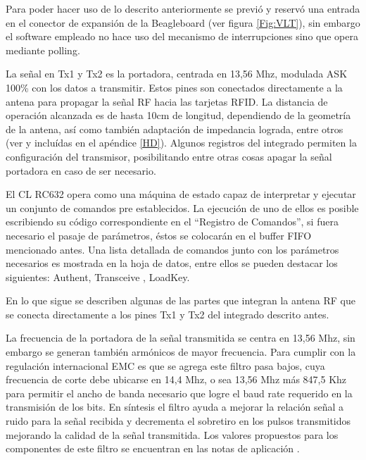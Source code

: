 Para poder hacer uso de lo descrito anteriormente se previó y reservó una entrada en el conector de expansión de la Beagleboard (ver figura \ref{Fig:VLT}), sin embargo el software empleado no hace uso del mecanismo de interrupciones sino que opera mediante polling.

\bigskip
{}

La señal en Tx1 y Tx2 es la portadora, centrada en 13,56 Mhz, modulada ASK 100\% con los datos a transmitir. Estos pines son conectados directamente a la antena para propagar la señal RF hacia las tarjetas RFID. La distancia de operación alcanzada es de hasta 10cm de longitud, dependiendo de la geometría de la antena, así como también adaptación de impedancia lograda, entre otros (ver \cite{MRICF} y \cite{RFIDPA} incluídas en el apéndice \ref{HD}).
Algunos registros del integrado permiten la configuración del transmisor, posibilitando entre otras cosas apagar la señal portadora en caso de ser necesario.

\bigskip
{}

El CL RC632 opera como una máquina de estado capaz de interpretar y ejecutar un conjunto de comandos pre establecidos. La ejecución de uno de ellos es posible escribiendo su código correspondiente en el “Registro de Comandos”, si fuera necesario el pasaje de parámetros, éstos se colocarán en el buffer FIFO mencionado antes. 
Una lista detallada de comandos junto con los parámetros necesarios es mostrada en la hoja de datos, entre ellos se pueden destacar los siguientes: Authent, Transceive , LoadKey.

\bigskip
{}

En lo que sigue se describen algunas de las partes que integran la antena RF que se conecta directamente a los pines Tx1 y Tx2 del integrado descrito antes.

\bigskip
{}

La frecuencia de la portadora de la señal transmitida se centra en 13,56 Mhz, sin embargo se generan también armónicos de mayor frecuencia. Para cumplir con la regulación internacional EMC es que se agrega este filtro pasa bajos, cuya frecuencia de corte debe ubicarse en 14,4 Mhz, o sea 13,56 Mhz más 847,5 Khz para permitir el ancho de banda necesario que logre el baud rate requerido en la transmisión de los bits. 
En síntesis el filtro ayuda a mejorar la relación señal a ruido para la señal recibida y decrementa el sobretiro en los pulsos transmitidos mejorando la calidad de la señal transmitida.
Los valores propuestos para los componentes de este filtro se encuentran en las notas de aplicación \cite{MRICF}.

